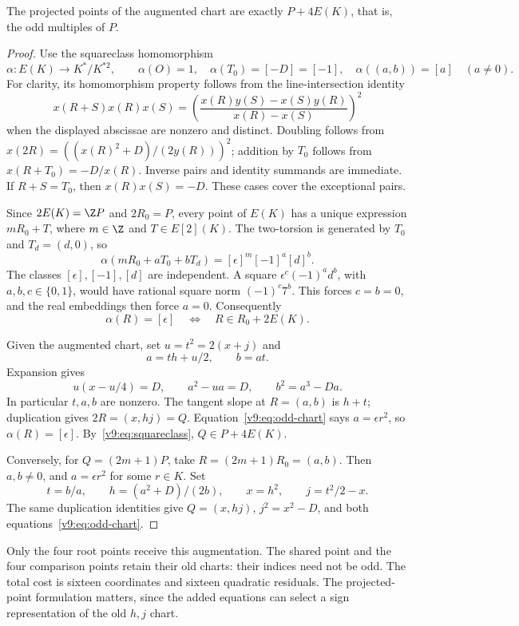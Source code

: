 \begin{proposition}\label{v9:prop:odd-chart}
The projected points of the augmented chart are exactly $P+4E(K)$, that is, the odd multiples of $P$.
\end{proposition}
\begin{proof}
Use the squareclass homomorphism
\[
 \alpha:E(K)\longrightarrow K^*/K^{*2},\qquad
 \alpha(O)=1,\quad \alpha(T_0)=[-D]=[-1],\quad
 \alpha((a,b))=[a]\quad(a\ne0).
\]
For clarity, its homomorphism property follows from the line-intersection identity
\[
 x(R+S)x(R)x(S)=
 \left(\frac{x(R)y(S)-x(S)y(R)}{x(R)-x(S)}\right)^2
\]
when the displayed abscissae are nonzero and distinct. Doubling follows from
$x(2R)=((x(R)^2+D)/(2y(R)))^2$; addition by $T_0$ follows from $x(R+T_0)=-D/x(R)$. Inverse pairs and identity summands are immediate. If $R+S=T_0$, then $x(R)x(S)=-D$. These cases cover the exceptional pairs.

Since $2E(K)=\Z P$ and $2R_0=P$, every point of $E(K)$ has a unique expression $mR_0+T$, where $m\in\Z$ and $T\in E[2](K)$. The two-torsion is generated by $T_0$ and $T_d=(d,0)$, so
\[
 \alpha(mR_0+aT_0+bT_d)=[\epsilon]^m[-1]^a[d]^b.
\]
The classes $[\epsilon],[-1],[d]$ are independent. A square $\epsilon^c(-1)^a d^b$, with $a,b,c\in\{0,1\}$, would have rational square norm $(-1)^c7^b$. This forces $c=b=0$, and the real embeddings then force $a=0$. Consequently
\begin{equation}\label{v9:eq:squareclass}
 \alpha(R)=[\epsilon]\quad\Longleftrightarrow\quad R\in R_0+2E(K).
\end{equation}

Given the augmented chart, set $u=t^2=2(x+j)$ and
\[
 a=th+u/2,\qquad b=at.
\]
Expansion gives
\[
 u(x-u/4)=D,\qquad a^2-ua=D,\qquad b^2=a^3-Da.
\]
In particular $t,a,b$ are nonzero. The tangent slope at $R=(a,b)$ is $h+t$; duplication gives $2R=(x,hj)=Q$. Equation~\eqref{v9:eq:odd-chart} says $a=\epsilon r^2$, so $\alpha(R)=[\epsilon]$. By~\eqref{v9:eq:squareclass}, $Q\in P+4E(K)$.

Conversely, for $Q=(2m+1)P$, take $R=(2m+1)R_0=(a,b)$. Then $a,b\ne0$, and $a=\epsilon r^2$ for some $r\in K$. Set
\[
 t=b/a,\qquad h=(a^2+D)/(2b),\qquad x=h^2,
 \qquad j=t^2/2-x.
\]
The same duplication identities give $Q=(x,hj)$, $j^2=x^2-D$, and both equations~\eqref{v9:eq:odd-chart}.
\end{proof}

Only the four root points receive this augmentation. The shared point and the four comparison points retain their old charts: their indices need not be odd. The total cost is sixteen coordinates and sixteen quadratic residuals. The projected-point formulation matters, since the added equations can select a sign representation of the old $h,j$ chart.

